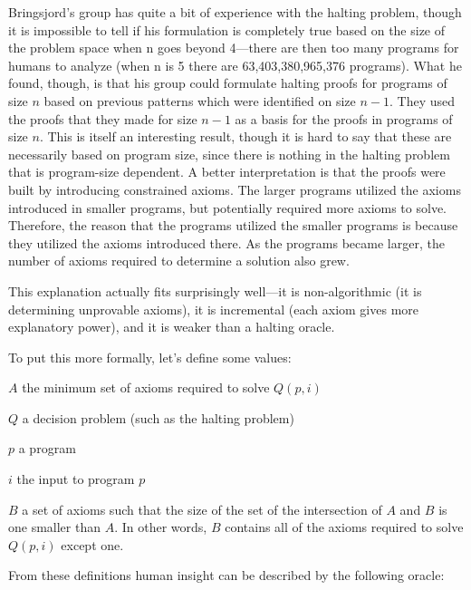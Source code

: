 Bringsjord's group has quite a bit of experience with the halting problem, though it is impossible to tell if his formulation is completely true based on the size of the problem space when n goes beyond 4---there are then too many programs for humans to analyze (when n is 5 there are 63,403,380,965,376 programs).  What he found, though, is that his group could formulate halting proofs for programs of size $n$ based on previous patterns which were identified on size $n - 1$.  They used the proofs that they made for size $n - 1$ as a basis for the proofs in programs of size $n$.  This is itself an interesting result, though it is hard to say that these are necessarily based on program size, since there is nothing in the halting problem that is program-size dependent.  A better interpretation is that the proofs were built by introducing constrained axioms.  The larger programs utilized the axioms introduced in smaller programs, but potentially required more axioms to solve.  Therefore, the reason that the programs utilized the smaller programs is because they utilized the axioms introduced there.  As the programs became larger, the number of axioms required to determine a solution also grew.

This explanation actually fits surprisingly well---it is non-algorithmic (it is determining unprovable axioms), it is incremental (each axiom gives more explanatory power), and it is weaker than a halting oracle.

To put this more formally, let's define some values: 

\begin{description}
\item{$A$}
the minimum set of axioms required to solve $Q(p, i)$

\item{$Q$}
a decision problem (such as the halting problem)

\item{$p$}
a program

\item{$i$} 
the input to program $p$

\item{$B$}
a set of axioms such that the size of the set of the intersection of $A$ and $B$ is one smaller than $A$.  In other words, $B$ contains all of the axioms required to solve $Q(p, i)$ except one.
\end{description}

From these definitions human insight can be described by the following oracle:

